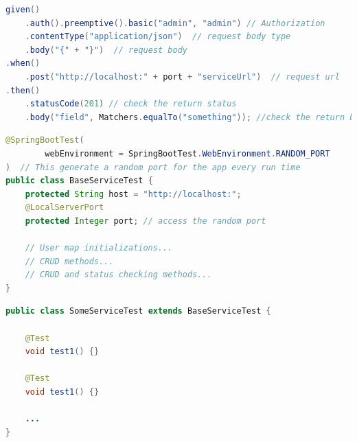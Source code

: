 \bigskip

\begin{lstlisting}[language={java}]
given()  
	.auth().preemptive().basic("admin", "admin") // Authorization
	.contentType("application/json")  // request body type
	.body("{" + "}")  // request body
.when()  
	.post("http://localhost:" + port + "serviceUrl")  // request url
.then()  
	.statusCode(201) // check the return status
	.body("field", Matchers.equalTo("something")); //check the return body
\end{lstlisting}

\begin{lstlisting}[language={java}]
@SpringBootTest(  
        webEnvironment = SpringBootTest.WebEnvironment.RANDOM_PORT  
)  // This generate a random port for the app every run time 
public class BaseServiceTest {  
    protected String host = "http://localhost:"; 
    @LocalServerPort  
    protected Integer port; // access the random port

    // User map initializations...
    // CRUD methods...
    // CRUD and status checking methods...
}
\end{lstlisting}

\begin{lstlisting}[language={java}]
public class SomeServiceTest extends BaseServiceTest {

	@Test
	void test1() {}
	
	@Test
	void test1() {}
	
	...
}
\end{lstlisting}

